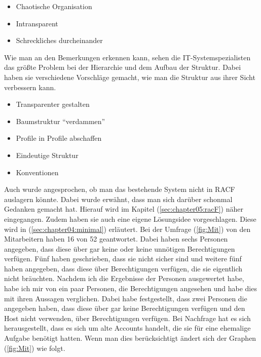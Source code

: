 \begin{itemize}
	\item Chaotische Organisation
	\item Intransparent
	\item Schreckliches durcheinander
\end{itemize}

Wie man an den Bemerkungen erkennen kann, sehen die IT-Systemspezialisten das größte Problem bei der Hierarchie und dem Aufbau der Struktur.
Dabei haben sie verschiedene Vorschläge gemacht, wie man die Struktur aus ihrer Sicht verbessern kann.

\begin{itemize}
	\item Transparenter gestalten
	\item Baumstruktur "`verdammen"'
	\item Profile in Profile abschaffen
	\item Eindeutige Struktur
	\item Konventionen
\end{itemize}
Auch wurde angesprochen, ob man das bestehende System nicht in RACF auslagern könnte.
Dabei wurde erwähnt, dass man sich darüber schonmal Gedanken gemacht hat.
Hierauf wird im Kapitel (\ref{sec:chapter05:racF}) näher eingegangen.
Zudem haben sie auch eine eigene Lösungsidee vorgeschlagen.
Diese wird in (\ref{sec:chapter04:minimal}) erläutert.
\newline
\newline
Bei der Umfrage (\ref{fig:Mit}) von den Mitarbeitern haben 16 von 52 geantwortet.
Dabei haben sechs Personen angegeben, dass diese über gar keine oder keine unnötigen Berechtigungen verfügen.
Fünf haben geschrieben, dass sie nicht sicher sind und weitere fünf haben angegeben, dass diese über Berechtigungen verfügen, die sie eigentlich nicht bräuchten.
Nachdem ich die Ergebnisse der Personen ausgewertet habe, habe ich mir von ein paar Personen, die Berechtigungen angesehen und habe dies mit ihren Aussagen verglichen.
Dabei habe festgestellt, dass zwei Personen die angegeben haben, dass diese über gar keine Berechtigungen verfügen und den Host nicht verwenden, über Berechtigungen verfügen.
Bei Nachfrage hat es sich herausgestellt, dass es sich um alte Accounts handelt, die sie für eine ehemalige Aufgabe benötigt hatten.
Wenn man dies berücksichtigt ändert sich der Graphen (\ref{fig:Mit}) wie folgt.
